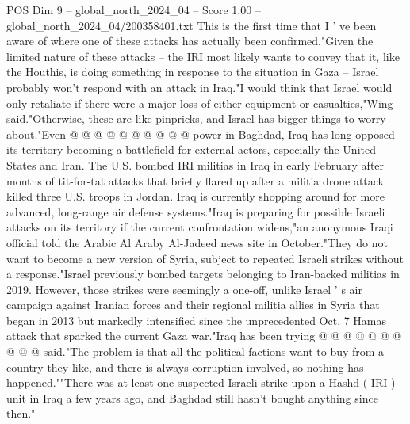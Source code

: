 \begin{textsample}{POS Dim 9 – global\_north\_2024\_04 – Score 1.00 – global\_north\_2024\_04/200358401.txt}
This is the first time that I ' ve been aware of where one of these attacks has actually been confirmed."Given the limited nature of these attacks -- the IRI most likely wants to convey that it, like the Houthis, is doing something in response to the situation in Gaza -- Israel probably won't respond with an attack in Iraq."I would think that Israel would only retaliate if there were a major loss of either equipment or casualties,"Wing said."Otherwise, these are like pinpricks, and Israel has bigger things to worry about."Even @ @ @ @ @ @ @ @ @ @ power in Baghdad, Iraq has long opposed its territory becoming a battlefield for external actors, especially the United States and Iran.
The U.S. bombed IRI militias in Iraq in early February after months of tit-for-tat attacks that briefly flared up after a militia drone attack killed three U.S. troops in Jordan.
Iraq is currently shopping around for more advanced, long-range air defense systems."Iraq is preparing for possible Israeli attacks on its territory if the current confrontation widens,"an anonymous Iraqi official told the Arabic Al Araby Al-Jadeed news site in October."They do not want to become a new version of Syria, subject to repeated Israeli strikes without a response."Israel previously bombed targets belonging to Iran-backed militias in 2019.
However, those strikes were seemingly a one-off, unlike Israel ' s air campaign against Iranian forces and their regional militia allies in Syria that began in 2013 but markedly intensified since the unprecedented Oct. 7 Hamas attack that sparked the current Gaza war."Iraq has been trying @ @ @ @ @ @ @ @ @ @ said."The problem is that all the political factions want to buy from a country they like, and there is always corruption involved, so nothing has happened.""There was at least one suspected Israeli strike upon a Hashd ( IRI ) unit in Iraq a few years ago, and Baghdad still hasn't bought anything since then."

\end{textsample}
